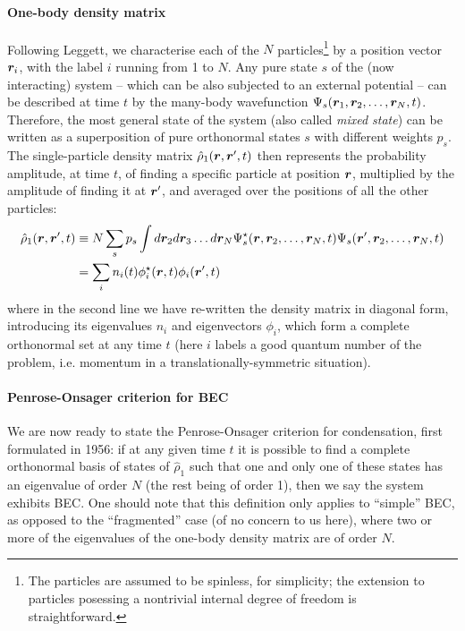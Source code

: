 \paragraph{One-body density matrix}
Following Leggett, we characterise each of the $N$
particles\footnote{The particles are assumed to be spinless, for
  simplicity; the extension to particles posessing a nontrivial
  internal degree of freedom is straightforward.} by a position vector
$\bm{r}_i$, with the label $i$ running from 1 to $N$. Any pure state $s$
of the (now interacting) system -- which can be also subjected to an
external potential -- can be described at time $t$ by the many-body
wavefunction $\Psi_s(\bm{r}_1,\bm{r}_2,\dots,\bm{r}_N,t)$. Therefore, the most
general state of the system (also called \textit{mixed state}) can be
written as a superposition of pure orthonormal states $s$ with
different weights $p_s$. The single-particle density matrix
$\hat{\rho}_1(\bm{r},\bm{r}^{\prime},t)$ then represents the probability
amplitude, at time $t$, of finding a specific particle at position
$\bm{r}$, multiplied by the amplitude of finding it at $\bm{r}^{\prime}$,
and averaged over the positions of all the other particles:
%
\begin{align}\label{eq:one-particle-rho}
  \hat{\rho}_1(\bm{r},\bm{r}^{\prime},t) & \equiv N \sum_s p_s \int d\bm{r}_2d\bm{r}_3\dots
d\bm{r}_N
\Psi_s^{\star}(\bm{r},\bm{r}_2,\dots,\bm{r}_N,t)\Psi_s(\bm{r}^{\prime},\bm{r}_2,\dots,\bm{r}_N,t)\nonumber\\
& = \sum_i n_i(t) \phi_i^{\star}(\bm{r},t) \phi_i(\bm{r}^{\prime},t)
\end{align}
% 
where in the second line we have re-written the density matrix in
diagonal form, introducing its eigenvalues $n_i$ and eigenvectors
$\phi_i$, which form a complete orthonormal set at any time $t$ (here
$i$ labels a good quantum number of the problem, i.e. momentum in a
translationally-symmetric situation).

\paragraph{Penrose-Onsager criterion for BEC}
We are now ready to state the Penrose-Onsager criterion for
condensation, first formulated in 1956: if at any given time $t$ it is
possible to find a complete orthonormal basis of states of
$\hat{\rho}_1$ such that one and only one of these states has an
eigenvalue of order $N$ (the rest being of order 1), then we say the
system exhibits BEC. One should note that this definition only applies
to ``simple'' BEC, as opposed to the ``fragmented'' case (of no
concern to us here), where two or more of the eigenvalues of the
one-body density matrix are of order $N$.

